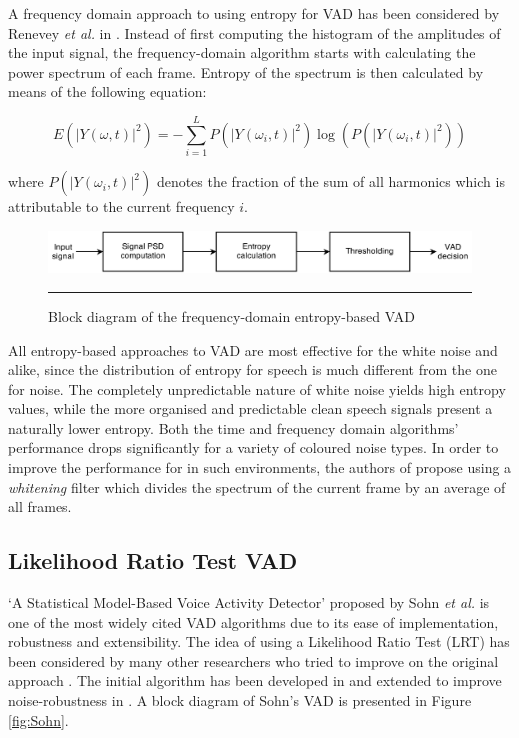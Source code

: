 A frequency domain approach to using entropy for VAD has been considered by Renevey \emph{et al.} in \cite{Renevey}. Instead of first computing the histogram of the amplitudes of the input signal, the frequency-domain algorithm starts with calculating the power spectrum of each frame. Entropy of the spectrum is then calculated by means of the following equation:

\begin{equation}
E( \left |  Y \left ( \omega, t \right ) \right |^{2} ) = - \sum_{i=1}^{L} P( \left |  Y \left ( \omega_i, t \right ) \right |^{2} ) \log \left( P( \left |  Y \left ( \omega_i, t \right ) \right |^{2} ) \right)
\end{equation}

where $P( \left |  Y \left ( \omega_i, t \right ) \right |^{2} )$ denotes the fraction of the sum of all harmonics which is attributable to the current frequency $i$.

\begin{figure}[htbp]
	\centering
		\includegraphics[width=0.9\columnwidth]{Figures/Chapter2/Renevey.png}
		\rule{37em}{0.5pt}
	\caption[Block diagram of the frequency-domain entropy-based VAD]{Block diagram of the frequency-domain entropy-based VAD \cite{Renevey}}
	\label{fig:Renevey}
\end{figure}

All entropy-based approaches to VAD are most effective for the white noise and alike, since the distribution of entropy for speech is much different from the one for noise. The completely unpredictable nature of white noise yields high entropy values, while the more organised and predictable clean speech signals present a naturally lower entropy. Both the time and frequency domain algorithms' performance drops significantly for a variety of coloured noise types. In order to improve the performance for in such environments, the authors of \cite{Renevey} propose using a \emph{whitening} filter which divides the spectrum of the current frame by an average of all frames.

\subsection{Likelihood Ratio Test VAD}
\label{ssec:LRT}

`A Statistical Model-Based Voice Activity Detector' proposed by Sohn \emph{et al.} \cite{Sohn} is one of the most widely cited VAD algorithms due to its ease of implementation, robustness and extensibility. The idea of using a Likelihood Ratio Test (LRT) has been considered by many other researchers who tried to improve on the original approach \cite{ImprovedLikelihood, Cho}. The initial algorithm has been developed in \cite{SohnInitial} and extended to improve noise-robustness in \citep{Sohn}. A block diagram of Sohn's VAD is presented in Figure \ref{fig:Sohn}.

